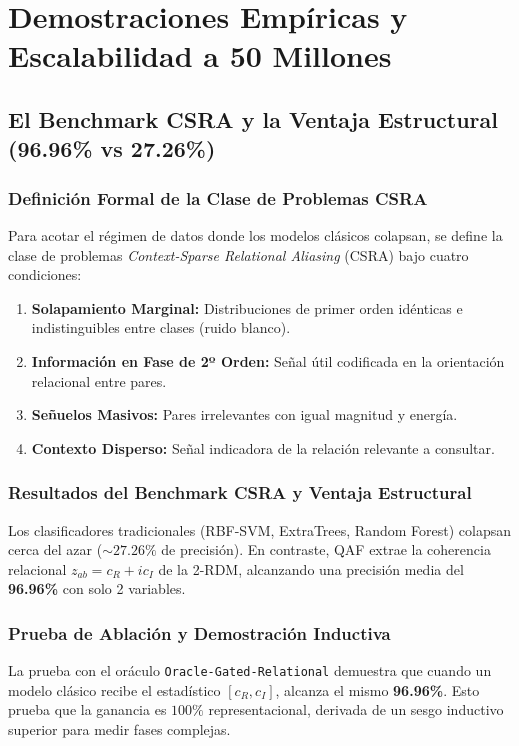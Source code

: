 \documentclass[11pt,a4paper,oneside]{report}
\begin{document}
\part{Demostraciones Empíricas y Escalabilidad a 50 Millones}

\chapter{El Benchmark CSRA y la Ventaja Estructural (96.96\% vs 27.26\%)}
\label{cap:benchmark_csra}

\section{Definición Formal de la Clase de Problemas CSRA}
Para acotar el régimen de datos donde los modelos clásicos colapsan, se define la clase de problemas \emph{Context-Sparse Relational Aliasing} (CSRA) bajo cuatro condiciones:
\begin{enumerate}
    \item \textbf{Solapamiento Marginal:} Distribuciones de primer orden idénticas e indistinguibles entre clases (ruido blanco).
    \item \textbf{Información en Fase de 2º Orden:} Señal útil codificada en la orientación relacional entre pares.
    \item \textbf{Señuelos Masivos:} Pares irrelevantes con igual magnitud y energía.
    \item \textbf{Contexto Disperso:} Señal indicadora de la relación relevante a consultar.
\end{enumerate}

\section{Resultados del Benchmark CSRA y Ventaja Estructural}
Los clasificadores tradicionales (RBF-SVM, ExtraTrees, Random Forest) colapsan cerca del azar ($\sim 27.26\%$ de precisión). En contraste, QAF extrae la coherencia relacional $z_{ab} = c_R + i c_I$ de la 2-RDM, alcanzando una precisión media del \textbf{96.96\%} con solo 2 variables.

\section{Prueba de Ablación y Demostración Inductiva}
La prueba con el oráculo \texttt{Oracle-Gated-Relational} demuestra que cuando un modelo clásico recibe el estadístico $[c_R, c_I]$, alcanza el mismo \textbf{96.96\%}. Esto prueba que la ganancia es $100\%$ representacional, derivada de un sesgo inductivo superior para medir fases complejas.
\end{document}
